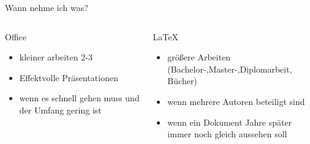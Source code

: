 \begin{frame}{Wann nehme ich was?}
	\begin{columns}
	\centering
		\begin{column}{0.45\textwidth}
			Office
			\begin{itemize}[<+->]
			\item kleiner arbeiten 2-3
			\item Effektvolle Präsentationen
			\item wenn es schnell gehen muss und der Umfang gering ist
			\end{itemize}
		\end{column}
		\begin{column}{0.45\textwidth}
			\LaTeX
			\begin{itemize}[<+->]
			\item größere Arbeiten (Bachelor-,Master-,Diplomarbeit, Bücher)
			\item wenn mehrere Autoren beteiligt sind
			\item wenn ein Dokument Jahre später immer noch gleich aussehen soll
			\end{itemize}
		\end{column}
	\end{columns}
\end{frame}